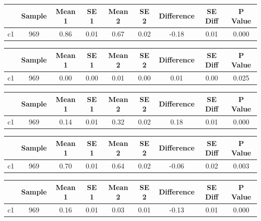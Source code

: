 {
\def\sym#1{\ifmmode^{#1}\else\(^{#1}\)\fi}
\begin{tabular}{l*{1}{cccccccc}}
\hline\hline
            &      Sample&      Mean 1&        SE 1&      Mean 2&        SE 2&  Difference&     SE Diff&     P Value\\
\hline
c1          &         969&        0.86&        0.01&        0.67&        0.02&       -0.18&        0.01&       0.000\\
\hline\hline
\end{tabular}
}
{
\def\sym#1{\ifmmode^{#1}\else\(^{#1}\)\fi}
\begin{tabular}{l*{1}{cccccccc}}
\hline\hline
            &      Sample&      Mean 1&        SE 1&      Mean 2&        SE 2&  Difference&     SE Diff&     P Value\\
\hline
c1          &         969&        0.00&        0.00&        0.01&        0.00&        0.01&        0.00&       0.025\\
\hline\hline
\end{tabular}
}
{
\def\sym#1{\ifmmode^{#1}\else\(^{#1}\)\fi}
\begin{tabular}{l*{1}{cccccccc}}
\hline\hline
            &      Sample&      Mean 1&        SE 1&      Mean 2&        SE 2&  Difference&     SE Diff&     P Value\\
\hline
c1          &         969&        0.14&        0.01&        0.32&        0.02&        0.18&        0.01&       0.000\\
\hline\hline
\end{tabular}
}
{
\def\sym#1{\ifmmode^{#1}\else\(^{#1}\)\fi}
\begin{tabular}{l*{1}{cccccccc}}
\hline\hline
            &      Sample&      Mean 1&        SE 1&      Mean 2&        SE 2&  Difference&     SE Diff&     P Value\\
\hline
c1          &         969&        0.70&        0.01&        0.64&        0.02&       -0.06&        0.02&       0.003\\
\hline\hline
\end{tabular}
}
{
\def\sym#1{\ifmmode^{#1}\else\(^{#1}\)\fi}
\begin{tabular}{l*{1}{cccccccc}}
\hline\hline
            &      Sample&      Mean 1&        SE 1&      Mean 2&        SE 2&  Difference&     SE Diff&     P Value\\
\hline
c1          &         969&        0.16&        0.01&        0.03&        0.01&       -0.13&        0.01&       0.000\\
\hline\hline
\end{tabular}
}
